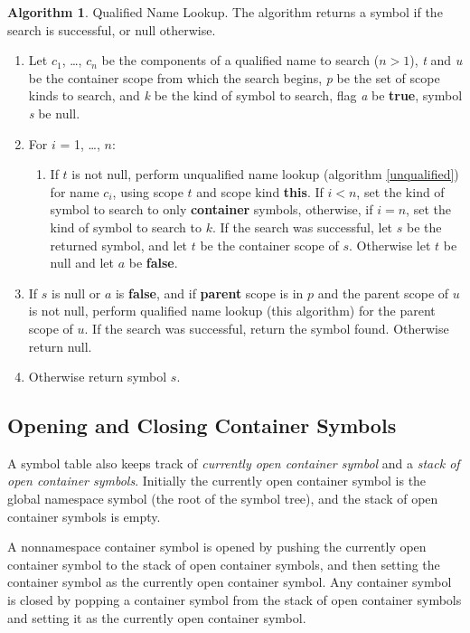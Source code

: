\documentclass[a4paper,oneside,11pt]{book}
\theoremstyle{definition}
\newtheorem{algo}{Algorithm}[section]
\begin{document}
\begin{algo} Qualified Name Lookup.
The algorithm returns a symbol if the search is successful, or null otherwise.
\begin{enumerate}
\item
Let $c_1$, \ldots, $c_n$ be the components of a qualified name to search ($n > 1$),
\emph{t} and \emph{u} be the container scope from which the search begins,
\emph{p} be the set of scope kinds to search, and \emph{k} be the kind of symbol to search,
flag \emph{a} be \textbf{true},
symbol \emph{s} be null.
\item
For $i$ = 1, \dots, $n$:
\begin{enumerate}
\item
If $t$ is not null, perform unqualified name lookup (algorithm \ref{unqualified}) for name $c_i$, using scope $t$ and scope kind \textbf{this}.
If $i < n$, set the kind of symbol to search to only \textbf{container} symbols, otherwise, if $i = n$, set the kind of symbol to search to $k$.
If the search was successful, let $s$ be the returned symbol, and let $t$ be the container scope of $s$.
Otherwise let $t$ be null and let $a$ be \textbf{false}.
\end{enumerate}
\item
If $s$ is null or $a$ is \textbf{false}, and if \textbf{parent} scope is in $p$ and the parent scope of $u$ is not null,
perform qualified name lookup (this algorithm) for the parent scope of $u$.
If the search was successful, return the symbol found. Otherwise return null.
\item
Otherwise return symbol $s$.
\end{enumerate}
\end{algo}

\subsection{Opening and Closing Container Symbols}\label{opencontainersymbol}

A symbol table also keeps track of \emph{currently open container symbol} and a \emph{stack of open container symbols}.
Initially the currently open container symbol is the global namespace symbol (the root of the symbol tree), and the
stack of open container symbols is empty.

A nonnamespace container symbol is opened by pushing the currently open container symbol to the stack of open container symbols,
and then setting the container symbol as the currently open container symbol.
Any container symbol is closed by popping a container symbol from the stack of open container symbols and setting it
as the currently open container symbol.
\end{document}

